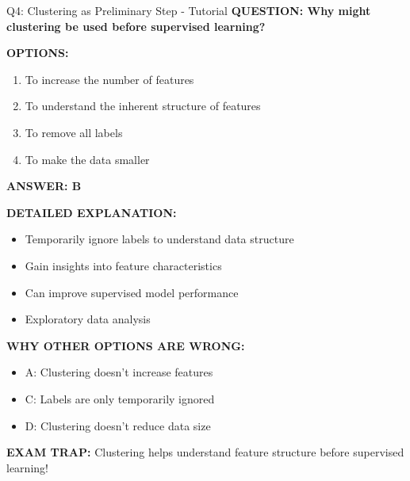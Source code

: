 \documentclass[8pt]{beamer}
\begin{document}
	\begin{frame}{Q4: Clustering as Preliminary Step - Tutorial}
		\fontsize{6.5}{7.5}\selectfont
		\textbf{QUESTION: Why might clustering be used before supervised learning?}
		
		\vspace{0.1cm}
		\textbf{OPTIONS:}
		\begin{enumerate}
			\item To increase the number of features
			\item To understand the inherent structure of features
			\item To remove all labels
			\item To make the data smaller
		\end{enumerate}
		
		\vspace{0.1cm}
		\textcolor{myblue}{\textbf{ANSWER: B}}
		
		\vspace{0.1cm}
		\textbf{DETAILED EXPLANATION:}
		\begin{itemize}
			\item Temporarily ignore labels to understand data structure
			\item Gain insights into feature characteristics
			\item Can improve supervised model performance
			\item Exploratory data analysis
		\end{itemize}
		
		\vspace{0.1cm}
		\textcolor{myred}{\textbf{WHY OTHER OPTIONS ARE WRONG:}}
		\begin{itemize}
			\item \textcolor{myred}{A:} Clustering doesn't increase features
			\item \textcolor{myred}{C:} Labels are only temporarily ignored
			\item \textcolor{myred}{D:} Clustering doesn't reduce data size
		\end{itemize}
		
		\textcolor{myred}{\textbf{EXAM TRAP:}} Clustering helps \textcolor{myblue}{understand feature structure} before supervised learning!
	\end{frame}
	
\end{document}
